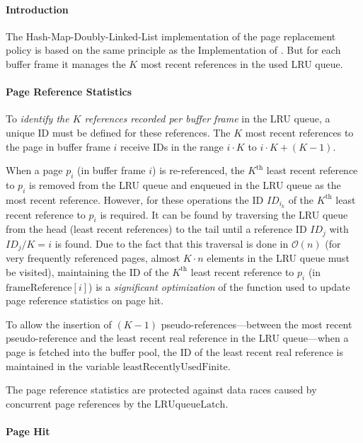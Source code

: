 \paragraph{Introduction}

    The Hash-Map-Doubly-Linked-List implementation of the  page replacement policy is based on the same principle as the  Implementation of . But for each buffer frame it manages the $K$ most recent references in the used LRU queue.

\paragraph{Page Reference Statistics}

    To \emph{identify the $K$ references recorded per buffer frame} in the LRU queue, a unique ID must be defined for these references. The $K$ most recent references to the page in buffer frame $i$ receive IDs in the range $i \cdot K$ to $i \cdot K + (K - 1)$.

    When a page $p_i$ (in buffer frame $i$) is re-referenced, the $K^{\text{th}}$ least recent reference to $p_i$ is removed from the LRU queue and enqueued in the LRU queue as the most recent reference. However, for these operations the ID $ID_{i_k}$ of the $K^{\text{th}}$ least recent reference to $p_i$ is required. It can be found by traversing the LRU queue from the head (least recent references) to the tail until a reference ID $ID_j$ with $ID_j / K = i$ is found. Due to the fact that this traversal is done in $\mathcal{O}\left(n\right)$ (for very frequently referenced pages, almost $K \cdot n$ elements in the LRU queue must be visited), maintaining the ID of the $K^{\text{th}}$ least recent reference to $p_i$ (in $\text{frameReference}\left[i\right]$) is a \emph{significant optimization} of the function used to update page reference statistics on page hit.

    To allow the insertion of $\left(K - 1\right)$ pseudo-references---between the most recent pseudo-reference and the least recent real reference in the LRU queue---when a page is fetched into the buffer pool, the ID of the least recent real reference is maintained in the variable $\text{leastRecentlyUsedFinite}$.

    The page reference statistics are protected against data races caused by concurrent page references by the $\text{LRUqueueLatch}$.

\paragraph{Page Hit}

